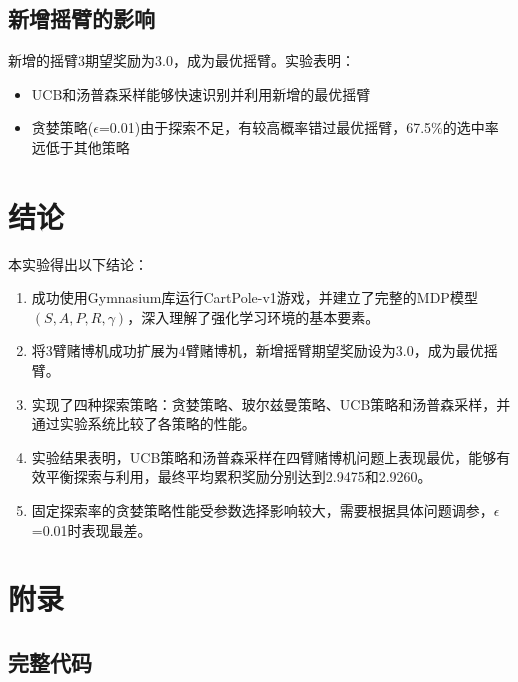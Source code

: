 \documentclass[12pt,a4paper]{article}
\begin{document}
\subsection{新增摇臂的影响}

新增的摇臂3期望奖励为3.0，成为最优摇臂。实验表明：

\begin{itemize}
    \item UCB和汤普森采样能够快速识别并利用新增的最优摇臂
    \item 贪婪策略($\epsilon$=0.01)由于探索不足，有较高概率错过最优摇臂，67.5\%的选中率远低于其他策略
\end{itemize}

\section{结论}

本实验得出以下结论：

\begin{enumerate}
    \item 成功使用Gymnasium库运行CartPole-v1游戏，并建立了完整的MDP模型$(S, A, P, R, \gamma)$，深入理解了强化学习环境的基本要素。
    
    \item 将3臂赌博机成功扩展为4臂赌博机，新增摇臂期望奖励设为3.0，成为最优摇臂。
    
    \item 实现了四种探索策略：贪婪策略、玻尔兹曼策略、UCB策略和汤普森采样，并通过实验系统比较了各策略的性能。
    
    \item 实验结果表明，UCB策略和汤普森采样在四臂赌博机问题上表现最优，能够有效平衡探索与利用，最终平均累积奖励分别达到2.9475和2.9260。
    
    \item 固定探索率的贪婪策略性能受参数选择影响较大，需要根据具体问题调参，$\epsilon$=0.01时表现最差。
\end{enumerate}

\newpage

\section*{附录}


\subsection*{完整代码}
\end{document}
